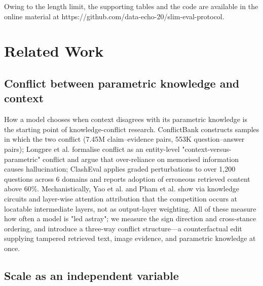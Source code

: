 \documentclass[pdflatex,sn-basic,Numbered]{sn-jnl}
\theoremstyle{thmstyleone}
\theoremstyle{thmstyletwo}
\theoremstyle{thmstylethree}
\begin{document}
Owing to the length limit, the supporting tables and the code are available in the online material at https://github.com/data-echo-20/slim-eval-protocol.

\section{Related Work}\label{sec:2}

\subsection{Conflict between parametric knowledge and context}
\label{sec:2-1}

How a model chooses when context disagrees with its parametric knowledge is the starting point of knowledge-conflict research. ConflictBank \cite{ref1} constructs samples in which the two conflict (7.45M claim–evidence pairs, 553K question–answer pairs); Longpre et al. \cite{ref2} formalise conflict as an entity-level "context-versus-parametric" conflict and argue that over-reliance on memorised information causes hallucination; ClashEval \cite{ref4} applies graded perturbations to over 1,200 questions across 6 domains and reports adoption of erroneous retrieved content above 60\%. Mechanistically, Yao et al. \cite{ref20} and Pham et al. \cite{ref22} show via knowledge circuits and layer-wise attention attribution that the competition occurs at locatable intermediate layers, not as output-layer weighting. All of these measure how often a model is "led astray"; we measure the sign direction and cross-stance ordering, and introduce a three-way conflict structure—a counterfactual edit supplying tampered retrieved text, image evidence, and parametric knowledge at once.

\subsection{Scale as an independent variable}
\label{sec:2-2}
\end{document}
